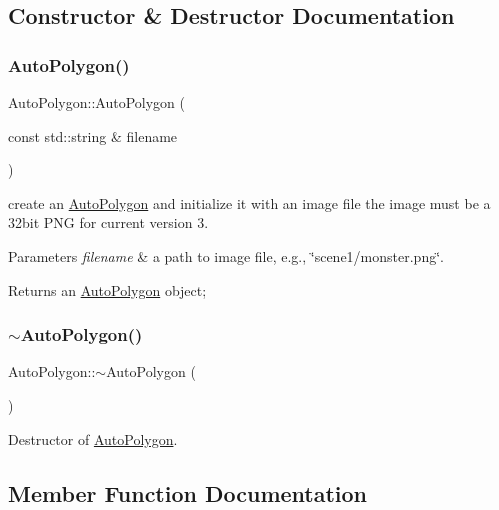 \subsection{Constructor \& Destructor Documentation}
\mbox{\label{classAutoPolygon_gaa74351ac8f735344958e7b2ac8363bb5}} 
\subsubsection{\texorpdfstring{Auto\+Polygon()}{AutoPolygon()}}
{\footnotesize\ttfamily Auto\+Polygon\+::\+Auto\+Polygon (\begin{DoxyParamCaption}\item[{const std\+::string \&}]{filename }\end{DoxyParamCaption})}

create an \hyperlink{classAutoPolygon}{Auto\+Polygon} and initialize it with an image file the image must be a 32bit P\+NG for current version 3. 
\begin{DoxyParams}{Parameters}
{\em filename} & a path to image file, e.\+g., \char`\"{}scene1/monster.\+png\char`\"{}. \\
\hline
\end{DoxyParams}
\begin{DoxyReturn}{Returns}
an \hyperlink{classAutoPolygon}{Auto\+Polygon} object; 
\end{DoxyReturn}
\mbox{\label{classAutoPolygon_gaca856dfbfddcb64d3fa29bf261dd10f8}} 
\subsubsection{\texorpdfstring{$\sim$\+Auto\+Polygon()}{~AutoPolygon()}}
{\footnotesize\ttfamily Auto\+Polygon\+::$\sim$\+Auto\+Polygon (\begin{DoxyParamCaption}{ }\end{DoxyParamCaption})}

Destructor of \hyperlink{classAutoPolygon}{Auto\+Polygon}. 

\subsection{Member Function Documentation}
\mbox{\label{classAutoPolygon_ga666950d66e9c86bab409f01b0daeb831}} 
